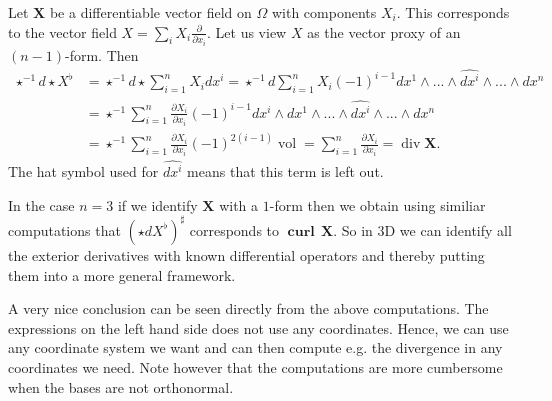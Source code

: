\documentclass[12pt,a4paper]{article}
\numberwithin{equation}{subsection}
\numberwithin{lemma}{subsection}
\theoremstyle{definition}
\DeclareMathOperator{\curl}{curl}
\DeclareMathOperator{\diver}{div}
\DeclareMathOperator{\vol}{vol}
\begin{document}
Let $\mathbf{X}$ be a differentiable vector field on $\Omega$ 
with components $X_i$. This corresponds to the vector field 
$X = \sum_i X_i \frac{\partial}{\partial x_i}$. Let us view
$X$ as the vector proxy 
of an $(n-1)$-form. Then 
\begin{align*}
    \star^{-1} d\star X^\flat &= \star^{-1} d\star \sum_{i=1}^n X_i dx^i
    = \star^{-1} d \sum_{i=1}^n X_i (-1)^{i-1} 
        dx^1 \wedge ... \wedge \widehat{dx^i} 
        \wedge ... 
        \wedge dx^n
    \\ &= \star^{-1} \sum_{i=1}^n \frac{\partial X_i}{\partial x_i} (-1)^{i-1} 
        dx^i \wedge 
        dx^1 \wedge ... \wedge \widehat{dx^i} \wedge ... \wedge dx^n
    \\ &= \star^{-1} \sum_{i=1}^n \frac{\partial X_i}{\partial x_i} 
        (-1)^{2(i-1)} \vol
    = \sum_{i=1}^n \frac{\partial X_i}{\partial x_i}
    = \diver \mathbf{X}.
\end{align*}
The hat symbol used for
$\widehat{dx^i}$ means that this term is left out. 

In the case $n=3$ if we identify $\mathbf{X}$ with a $1$-form then 
we obtain using similiar computations
that $(\star d X^\flat)^\sharp$ corresponds to  $\mathbf{\curl} \,\mathbf{X}$.
So in $3$D we can identify all the exterior derivatives with known differential
operators and thereby putting them into a more general framework.

A very nice conclusion can be seen directly from the above computations. The 
expressions on the left hand side does not use any coordinates. Hence, 
we can use any coordinate system we want and can then compute e.g. the 
divergence in any coordinates we need. Note however that the computations are
more cumbersome when the bases are not orthonormal.
\end{document}
